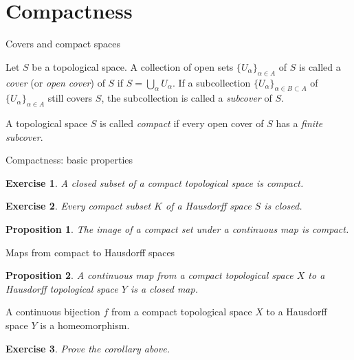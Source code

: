 \documentclass[10pt]{beamer}
\newtheorem{proposition}{Proposition}
\newtheorem{exercise}{Exercise}
\begin{document}
\section{Compactness}

\begin{frame}{Covers and compact spaces}
	\begin{definition}
		Let $S$ be a topological space. A collection of open sets
		$\{U_\alpha\}_{\alpha \in A}$ of $S$ is called a \emph{cover} (or
		\emph{open cover}) of $S$ if $S = \bigcup_{\alpha} U_\alpha$. If a
		subcollection $\{U_\alpha\}_{\alpha \in B \subset A}$ of
		$\{U_\alpha\}_{\alpha \in A}$ still covers $S$, the subcollection is
		called a \emph{subcover} of $S$.
	\end{definition}
	\begin{definition}
		A topological space $S$ is called \emph{compact} if every open cover of
		$S$ has a \emph{finite subcover}.
	\end{definition}
\end{frame}

\begin{frame}{Compactness: basic properties}
	\begin{exercise}
		A closed subset of a compact topological space is compact.
	\end{exercise}
	\begin{exercise}
		Every compact subset $K$ of a Hausdorff space $S$ is closed.
	\end{exercise}
	\begin{proposition}
		The image of a compact set under a continuous map is compact.
	\end{proposition}
\end{frame}

\begin{frame}{Maps from compact to Hausdorff spaces}
	\begin{proposition}
		A continuous map from a compact topological space $X$ to a Hausdorff
		topological space $Y$ is a closed map.
	\end{proposition}
	\begin{corollary}
		A continuous bijection $f$ from a compact topological space $X$ to a
		Hausdorff space $Y$ is a homeomorphism.
	\end{corollary}
	\begin{exercise}
		Prove the corollary above.
	\end{exercise}
\end{frame}
\end{document}
